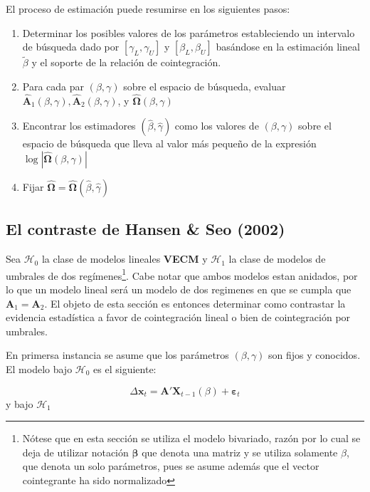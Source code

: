 \documentclass[12pt, twoside]{book}\usepackage[]{graphicx}\usepackage[]{color}
\numberwithin{equation}{section}
\numberwithin{theorem}{section}
\numberwithin{teorema}{section}
\numberwithin{defi}{section}
\numberwithin{prop}{section}
\numberwithin{defi}{section}
\theoremstyle{plain}
\begin{document}
El proceso de estimación puede resumirse en los siguientes pasos: 

\begin{enumerate}
\item Determinar los posibles valores de los parámetros estableciendo un intervalo de búsqueda dado por $[\gamma_{L},\gamma_{U}]$ y $[\beta_{L},\beta_{U}]$ basándose en la estimación lineal $\tilde{\beta}$ y el soporte de la relación de cointegración. 
\item Para cada par $(\beta,\gamma)$ sobre el espacio de búsqueda, evaluar $\hat{\mathbf{A}}_{1}(\beta,\gamma),\hat{\mathbf{A}}_{2}(\beta,\gamma)$, y $\hat{\boldsymbol{\Omega}}(\beta,\gamma)$
\item Encontrar los estimadores $(\hat{\beta},\hat{\gamma})$ como los valores de $(\beta,\gamma)$ sobre el espacio de búsqueda que lleva al valor más pequeño de la expresión $\log|\hat{\boldsymbol{\Omega}}(\beta,\gamma)|$
\item Fijar $\hat{\boldsymbol{\Omega}} = \hat{\boldsymbol{\Omega}}(\hat{\beta},\hat{\gamma})$
\end{enumerate}

\subsection{El contraste de Hansen \& Seo (2002)}
Sea $\mathcal{H}_{0}$ la clase de modelos lineales \textbf{VECM} y $\mathcal{H}_{1}$ la clase de modelos de umbrales de dos regímenes\footnote{Nótese que en esta sección se utiliza el modelo bivariado, razón por lo cual se deja de utilizar notación $\boldsymbol{\beta}$ que denota una matriz y se utiliza solamente $\beta$, que denota un solo parámetros, pues se asume además que el vector cointegrante ha sido normalizado}. Cabe notar que ambos modelos estan anidados, por lo que un modelo lineal será un modelo de dos regimenes en que se cumpla que $\mathbf{A}_{1}=\mathbf{A}_{2}$. El objeto de esta sección es entonces determinar como contrastar la evidencia estadística a favor de cointegración lineal o bien de cointegración por umbrales.  

En primersa instancia se asume que los parámetros $(\beta,\gamma)$ son fijos y conocidos. El modelo bajo $\mathcal{H}_{0}$ es el siguiente: 

\begin{equation}
\Delta \mathbf{x}_{t} = \mathbf{A}'\mathbf{X}_{t-1}(\beta)+\boldsymbol{\varepsilon}_{t}
\end{equation}
y bajo $\mathcal{H}_{1}$
\end{document}
